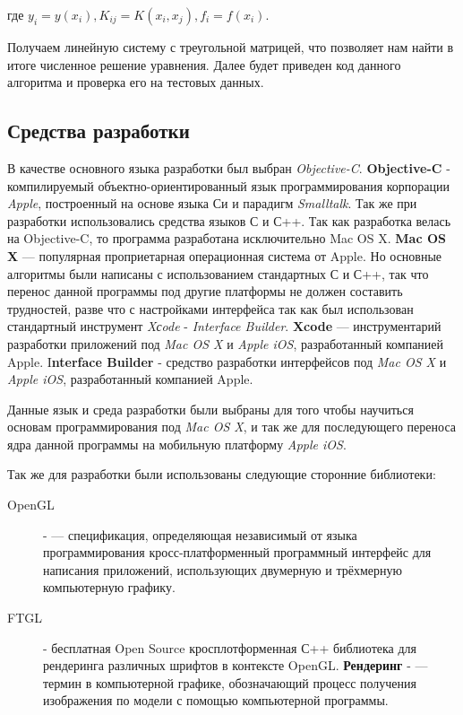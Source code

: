 где $y_i = y(x_i), K_{ij} = K(x_i, x_j), f_i = f(x_i)$.

Получаем линейную систему с треугольной матрицей, что позволяет нам найти в итоге численное решение уравнения. Далее будет приведен код данного алгоритма и проверка его на тестовых данных.
\begin{center}
\item\subsection{Средства разработки}
\end{center}
В качестве основного языка разработки был выбран \textit{Objective-C}. {\bfseries Objective-C} - компилируемый объектно-ориентированный язык программирования корпорации \textit{Apple}, построенный на основе языка Си и парадигм \textit{Smalltalk}. Так же при разработки использовались средства языков С и С++. Так как разработка велась на Objective-C, то программа разработана исключительно Mac OS X. {\bfseries Mac OS X} — популярная проприетарная операционная система от Apple. Но основные алгоритмы были написаны с использованием стандартных С и С++, так что перенос данной программы под другие платформы не должен составить трудностей, разве что с настройками интерфейса так как был использован стандартный инструмент \textit{Xсode} - \textit{Interface Builder}. {\bfseries Xcode} — инструментарий разработки приложений под \textit{Mac OS X} и \textit{Apple iOS}, разработанный компанией Apple. {I\bfseries nterface Builder} - средство разработки  интерфейсов под \textit{Mac OS X} и \textit{Apple iOS}, разработанный компанией Apple.

Данные язык и среда разработки были выбраны для того чтобы научиться основам программирования под \textit{Mac OS X}, и так же для последующего переноса ядра данной программы на мобильную платформу \textit{Apple iOS}. 

Так же для разработки были использованы следующие сторонние библиотеки:
\begin{description}
\item[OpenGL] -  — спецификация, определяющая независимый от языка программирования кросс-платформенный программный интерфейс для написания приложений, использующих двумерную и трёхмерную компьютерную графику.
\item[FTGL] - бесплатная Open Source кросплотформенная С++ библиотека для рендеринга различных шрифтов в контексте OpenGL. {\bfseries Рендеринг} -  — термин в компьютерной графике, обозначающий процесс получения изображения по модели с помощью компьютерной программы.
\end{description}

